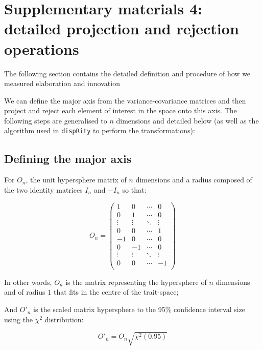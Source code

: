 \documentclass[12pt,letterpaper]{article}
\begin{document}
\newpage

\section{Supplementary materials 4: detailed projection and rejection operations}
\label{supp_projection}

The following section contains the detailed definition and procedure of how we measured elaboration and innovation

We can define the major axis from the variance-covariance matrices and then project and reject each element of interest in the space onto this axis.
The following steps are generalised to $n$ dimensions and detailed below (as well as the algorithm used in \texttt{dispRity} \cite{dispRity} to perform the transformations):

\subsection{Defining the major axis}

For $O_{n}$, the unit hypersphere matrix of $n$ dimensions and a radius composed of the two identity matrices $I_{n}$ and $-I_{n}$ so that: 

\begin{equation}
O_{n} = 
    \begin{pmatrix}
        1 & 0 & \cdots & 0 \\
        0 & 1 & \cdots & 0 \\
        \vdots  & \vdots  & \ddots & \vdots  \\
        0 & 0 & \cdots & 1 \\
        -1 & 0 & \cdots & 0 \\
        0 & -1 & \cdots & 0 \\
        \vdots  & \vdots  & \ddots & \vdots  \\
        0 & 0 & \cdots & -1 \\
    \end{pmatrix}
\end{equation}

In other words, $O_{n}$ is the matrix representing the hypersphere of $n$ dimensions and of radius $1$ that fits in the centre of the trait-space;

And $O'_{n}$ is the scaled matrix hypersphere to the 95\% confidence interval size using the $\chi^2$ distribution:

$$O'_{n} = O_{n} \sqrt{\chi^2(0.95)}$$
\end{document}
